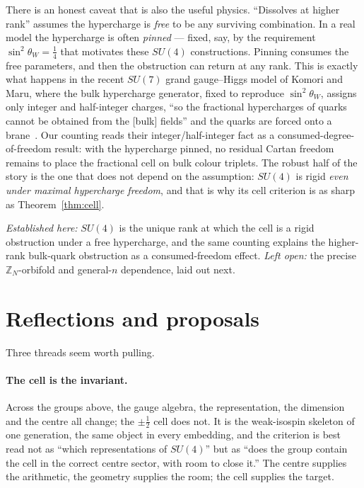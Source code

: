 \documentclass[11pt,a4paper]{article}
\newcommand{\ZZ}{\mathbb{Z}}
\begin{document}
There is an honest caveat that is also the useful physics. ``Dissolves at higher rank''
assumes the hypercharge is \emph{free} to be any surviving combination. In a real model the
hypercharge is often \emph{pinned} --- fixed, say, by the requirement
$\sin^2\theta_W=\tfrac14$ that motivates these $SU(4)$ constructions. Pinning consumes the
free parameters, and then the obstruction can return at any rank. This is exactly what
happens in the recent $SU(7)$ grand gauge--Higgs model of Komori and Maru, where the bulk
hypercharge generator, fixed to reproduce $\sin^2\theta_W$, assigns only integer and
half-integer charges, ``so the fractional hypercharges of quarks cannot be obtained from
the [bulk] fields'' and the quarks are forced onto a brane~\cite{KomoriMaru}. Our counting
reads their integer/half-integer fact as a consumed-degree-of-freedom result: with the
hypercharge pinned, no residual Cartan freedom remains to place the fractional cell on bulk
colour triplets. The robust half of the story is the one that does not depend on the
assumption: $SU(4)$ is rigid \emph{even under maximal hypercharge freedom}, and that is why
its cell criterion is as sharp as Theorem~\ref{thm:cell}.

\emph{Established here:} $SU(4)$ is the unique rank at which the cell is a rigid
obstruction under a free hypercharge, and the same counting explains the higher-rank
bulk-quark obstruction as a consumed-freedom effect. \emph{Left open:} the precise
$\ZZ_N$-orbifold and general-$n$ dependence, laid out next.

\section{Reflections and proposals}\label{sec:reflections}
Three threads seem worth pulling.

\paragraph{The cell is the invariant.} Across the groups above, the gauge algebra, the
representation, the dimension and the centre all change; the $\pm\tfrac12$ cell does not. It
is the weak-isospin skeleton of one generation, the same object in every embedding, and the
criterion is best read not as ``which representations of $SU(4)$'' but as ``does the group
contain the cell in the correct centre sector, with room to close it.'' The centre supplies
the arithmetic, the geometry supplies the room; the cell supplies the target.
\end{document}
